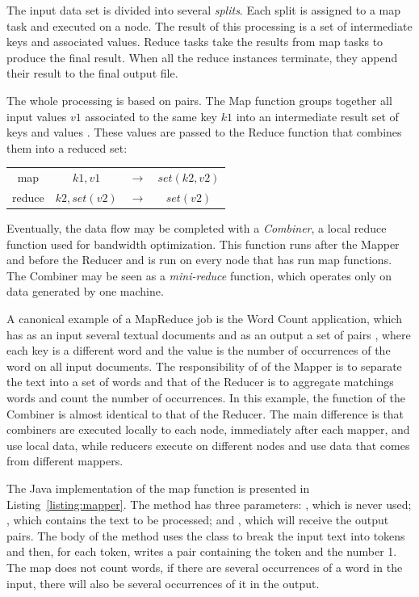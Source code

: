 The input data set is divided into several \emph{splits}. 
Each split is assigned to a map task and executed on a node. 
The result of this processing is a set of intermediate keys and associated values. 
Reduce tasks take the results from map tasks to produce the final result.
When all the reduce instances terminate, they append their result to the final output file.

The whole processing is based on  pairs. 
The Map function groups together all input values $v1$ associated to the
same key $k1$ into an intermediate result set of keys and values . 
These values are passed to the Reduce function that combines them into a reduced set: 

\begin{center}
\begin{tabular}{c c c c}
	\hline
	   map & $k1,v1$ & $\rightarrow$  & $set(k2, v2)$ \\
	   reduce & $k2, set(v2)$ & $\rightarrow$ & $set(v2)$ \\
	\hline
\end{tabular}
\end{center}

Eventually, the data flow may be completed with a \emph{Combiner}, a local reduce function used for bandwidth optimization.
This function runs after the Mapper and before the Reducer and is run on every node that has run map functions.
The Combiner may be seen as a \emph{mini-reduce} function, which operates only on data generated by one machine.

A canonical example of a MapReduce job is the Word Count application, which has as an input several textual documents and as an output a set of pairs , where each key is a different word and the value is the number of occurrences of the word on all input documents.
The responsibility of  of the Mapper is to separate the text into a set of words and that of the Reducer is to aggregate matchings words and count the number of occurrences.
In this example, the function of the Combiner is almost identical to that of the Reducer. The main difference is that combiners are executed locally to each node, immediately after each mapper, and use local data, while reducers execute on different nodes and use data that comes from different mappers.

The Java implementation of the map function is presented in Listing~\ref{listing:mapper}. 
The  method has three parameters: , which is never used; , which contains the text to be processed; and , which will receive the output pairs.
The body of the method uses the class  to break the input text into tokens and then, for each token, writes a pair containing the token and the number 1.
The map does not count words, if there are several occurrences of a word in the input, there will also be several occurrences of it in the output.

